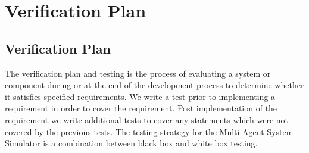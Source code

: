 \chapter{Verification Plan}\label{verification}

\section{Verification Plan}

The verification plan and testing is the process of evaluating a system or component during or at the end of the development process to determine whether it satisfies specified requirements. We write a test prior to implementing a requirement in order to cover the requirement. Post implementation of the requirement we write additional tests to cover any statements which were not covered by the previous tests. The testing strategy for the Multi-Agent System Simulator is a combination between black box and white box testing.

